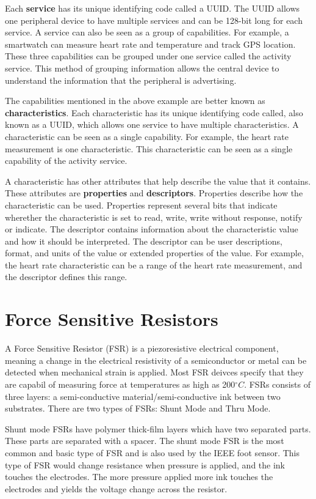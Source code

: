 Each \textbf{service} has its unique identifying code called a UUID. The UUID allows one peripheral device to have multiple services and can be 128-bit long for each service. A service can also be seen as a group of capabilities. For example, a smartwatch can measure heart rate and temperature and track GPS location. These three capabilities can be grouped under one service called the activity service. This method of grouping information allows the central device to understand the information that the peripheral is advertising.

The capabilities mentioned in the above example are better known as \textbf{characteristics}. Each characteristic has its unique identifying code called, also known as a UUID, which allows one service to have multiple characteristics. A characteristic can be seen as a single capability. For example, the heart rate measurement is one characteristic. This characteristic can be seen as a single capability of the activity service. 

A characteristic has other attributes that help describe the value that it contains. These attributes are \textbf{properties} and \textbf{descriptors}. Properties describe how the characteristic can be used. Properties represent several bits that indicate wherether the characteristic is set to read, write, write without response, notify or indicate. The descriptor contains information about the characteristic value and how it should be interpreted. The descriptor can be user descriptions, format, and units of the value or extended properties of the value\cite{mohammadafaneh2017}. For example, the heart rate characteristic can be a range of the heart rate measurement, and the descriptor defines this range.


\section{Force Sensitive Resistors}
A Force Sensitive Resistor (FSR) is a piezoresistive electrical component, meaning a change in the electrical resistivity of a semiconductor or metal can be detected when mechanical strain is applied. Most FSR deivces specify that they are capabil of measuring force at temperatures as high as 200$^\circ C$. FSRs consists of three layers: a semi-conductive material/semi-conductive ink between two substrates. There are two types of FSRs: Shunt Mode and Thru Mode.

Shunt mode FSRs have polymer thick-film layers which have two separated parts. These parts are separated with a spacer. The shunt mode FSR is the most common and basic type of FSR and is also used by the IEEE foot sensor. This type of FSR would change resistance when pressure is applied, and the ink touches the electrodes. The more pressure applied more ink touches the electrodes and yields the voltage change across the resistor.

